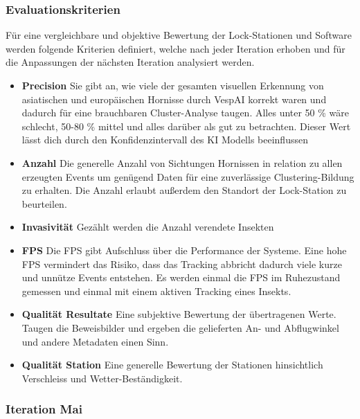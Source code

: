 \subsubsection{Evaluationskriterien}

Für eine vergleichbare und objektive Bewertung der Lock-Stationen und Software werden folgende Kriterien definiert, welche nach jeder Iteration erhoben und für die Anpassungen der nächsten Iteration analysiert werden.

\begin{itemize}
    \item[$\circ$] \textbf{Precision} 
    Sie gibt an, wie viele der gesamten visuellen Erkennung von asiatischen und europäischen Hornisse durch VespAI korrekt waren und dadurch für eine brauchbaren Cluster-Analyse taugen.
    Alles unter 50 \% wäre schlecht, 50-80 \% mittel und alles darüber als gut zu betrachten. Dieser Wert lässt dich durch den Konfidenzintervall des KI Modells beeinflussen
    
    \item[$\circ$] \textbf{Anzahl} 
    Die generelle Anzahl von Sichtungen Hornissen in relation zu allen erzeugten Events um genügend Daten für eine zuverlässige Clustering-Bildung zu erhalten. Die Anzahl erlaubt außerdem den Standort der Lock-Station zu beurteilen.

    \item[$\circ$] \textbf{Invasivität} 
    Gezählt werden die Anzahl verendete Insekten
    \item[$\circ$] \textbf{FPS} 
    Die \ac{FPS} gibt Aufschluss über die Performance der Systeme. Eine hohe \ac{FPS} vermindert das Risiko, dass das Tracking abbricht dadurch viele kurze und unnütze Events entstehen. Es werden einmal die FPS im Ruhezustand gemessen und einmal mit einem aktiven Tracking eines Insekts.
    \item[$\circ$] \textbf{Qualität Resultate}
    Eine subjektive Bewertung der übertragenen Werte. Taugen die Beweisbilder und ergeben die gelieferten An- und Abflugwinkel und andere Metadaten einen Sinn. 
    \item[$\circ$] \textbf{Qualität Station} 
    Eine generelle Bewertung der Stationen hinsichtlich Verschleiss und Wetter-Beständigkeit.   
\end{itemize}

\subsubsection{Iteration Mai}

